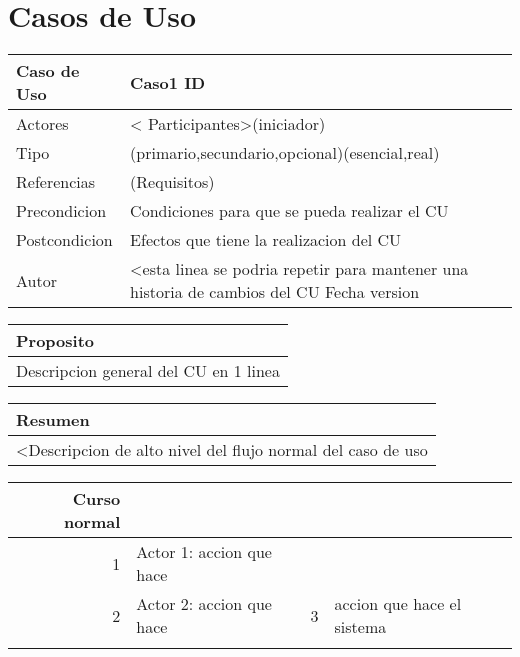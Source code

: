 \documentclass[10pt,a4paper,spanish]{report}
\begin{document}
\section{Casos de Uso}
\label{sec:org46092c4}

\begin{center}
\begin{tabular}{ll}
\hline
Caso de Uso & Caso1                  \vline ID\\
\hline
Actores & < Participantes>(iniciador)\\
\hline
Tipo & (primario,secundario,opcional)(esencial,real)\\
\hline
Referencias & (Requisitos)\\
\hline
Precondicion & Condiciones para que se pueda realizar el CU\\
\hline
Postcondicion & Efectos que tiene la realizacion del CU\\
\hline
Autor & <esta linea se podria repetir para mantener una historia de cambios del CU \vline Fecha \vline version \vline\\
\hline
\end{tabular}
\end{center}


\begin{center}
\begin{tabular}{l}
\hline
Proposito\\
\hline
Descripcion general del CU en 1 linea\\
\hline
\end{tabular}
\end{center}


\begin{center}
\begin{tabular}{l}
\hline
Resumen\\
\hline
<Descripcion de alto nivel del flujo normal del caso de uso\\
\hline
\end{tabular}
\end{center}

\begin{center}
\begin{tabular}{rlrl}
\hline
Curso normal &  &  & \\
\hline
1 & Actor 1: accion que hace &  & \\
\hline
2 & Actor 2: accion que hace & 3 & accion que hace el sistema\\
\hline
 &  &  & \\
\hline
\end{tabular}
\end{center}
\end{document}
